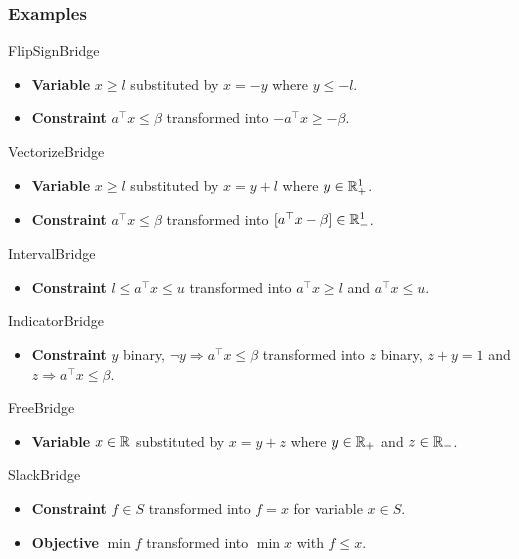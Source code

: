 \documentclass{beamer}
\begin{document}
  \begin{frame}[allowframebreaks]
    \frametitle{Examples}
    \begin{block}{FlipSignBridge}
      \begin{itemize}
        \item \textbf{Variable} $x \ge l$ substituted by $x = -y$ where $y \le -l$.
        \item \textbf{Constraint} $a^\top x \le \beta$ transformed into $-a^\top x \ge -\beta$.
      \end{itemize}
    \end{block}
    \begin{block}{VectorizeBridge}
      \begin{itemize}
        \item \textbf{Variable} $x \ge l$ substituted by $x = y + l$ where $y \in \mathbb{R}^1_+$.
        \item \textbf{Constraint} $a^\top x \le \beta$ transformed into $[a^\top x - \beta] \in \mathbb{R}^1_-$.
      \end{itemize}
    \end{block}
    \begin{block}{IntervalBridge}
      \begin{itemize}
        \item \textbf{Constraint} $l \le a^\top x \le u$ transformed into $a^\top x \ge l$ and $a^\top x \le u$.
      \end{itemize}
    \end{block}
    \begin{block}{IndicatorBridge}
      \begin{itemize}
        \item \textbf{Constraint} $y$ binary, $\neg y \Rightarrow a^\top x \le \beta$ transformed into $z$ binary, $z + y = 1$ and $z \Rightarrow a^\top x \le \beta$.
      \end{itemize}
    \end{block}
    \begin{block}{FreeBridge}
      \begin{itemize}
        \item \textbf{Variable} $x \in \mathbb{R}$ substituted by $x = y + z$ where $y \in \mathbb{R}_+$ and $z \in \mathbb{R}_-$.
      \end{itemize}
    \end{block}

    \begin{block}{SlackBridge}
      \begin{itemize}
        \item \textbf{Constraint} $f \in S$ transformed into $f = x$ for variable $x \in S$.
        \item \textbf{Objective} $\min f$ transformed into $\min x$ with $f \le x$.
      \end{itemize}
    \end{block}
  \end{frame}
\end{document}
